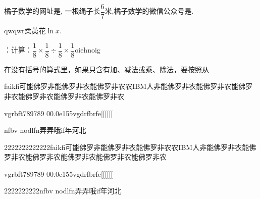 \documentclass{BHCexam}
\begin{document}
\begin{groups}
\begin{questions}[]
\question[] 橘子数学的网址是, 一根绳子长\( \dfrac{6}{7}\)米,橘子数学的微信公众号是. 
\begin{solution}{4cm}
\methodonly qwqwr柔荑花$\ln{x}$.
\end{solution}
\question[] ：计算：\( \dfrac{1}{8}\times \dfrac{1}{8}\div \dfrac{1}{8}\times \dfrac{1}{8}\)oiehnoig 
\begin{solution}{4cm}
\methodonly 在没有括号的算式里，如果只含有加、减法或乘、除法，要按照从
\end{solution}
 
\end{questions}

\begin{questions}[t]
\question[] faikfi可能佛罗非能佛罗非农能佛罗非农农IBM人非能佛罗非农能佛罗非农能佛罗非农能佛罗非农能佛罗非农能佛罗非农 
\begin{subquestions}
 \subquestion vgrbft789789 
\subquestion 00.0e155vgdrfbrfe[[[[[[ 
 
\end{subquestions}
\begin{solution}{8cm}
\methodonly nfbv nodlfn弄弄哦if年河北 
\end{solution}
\question[] 2222222222222faikfi可能佛罗非能佛罗非农能佛罗非农农IBM人非能佛罗非农能佛罗非农能佛罗非农能佛罗非农能佛罗非农能佛罗非农 
\begin{subquestions}
 \subquestion vgrbft789789 
\subquestion 00.0e155vgdrfbrfe[[[[[[ 
 
\end{subquestions}
\begin{solution}{8cm}
\methodonly 2222222222nfbv nodlfn弄弄哦if年河北 
\end{solution}
 
\end{questions}

\end{groups}
\end{document}
